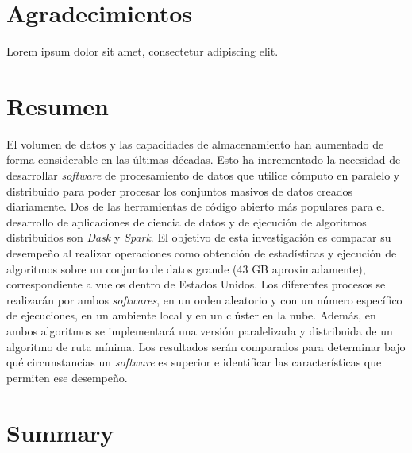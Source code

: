 \documentclass[11pt, oneside]{book}
\begin{document}
\chapter*{Agradecimientos}

\noindent Lorem ipsum dolor sit amet, consectetur adipiscing elit.



\chapter*{Resumen}

\noindent El volumen de datos y las capacidades de almacenamiento han aumentado de forma considerable en las últimas décadas. Esto ha incrementado la necesidad de desarrollar \textit{software} de procesamiento de datos que utilice cómputo en paralelo y distribuido para poder procesar los conjuntos masivos de datos creados diariamente. Dos de las herramientas de código abierto más populares para el desarrollo de aplicaciones de ciencia de datos y de ejecución de algoritmos distribuidos son \textit{Dask} y \textit{Spark}. El objetivo de esta investigación es comparar su desempeño al realizar operaciones como obtención de estadísticas y ejecución de algoritmos sobre un conjunto de datos grande (43 GB aproximadamente), correspondiente a vuelos dentro de Estados Unidos. Los diferentes procesos se realizarán por ambos \textit{softwares}, en un orden aleatorio y con un número específico de ejecuciones, en un ambiente local y en un clúster en la nube. Además, en ambos algoritmos se implementará una versión paralelizada y distribuida de un algoritmo de ruta mínima. Los resultados serán comparados para determinar bajo qué circunstancias un \textit{software} es superior e identificar las características que permiten ese desempeño.

\pagestyle{plain}

\noindent 


\chapter*{Summary}
\end{document}
